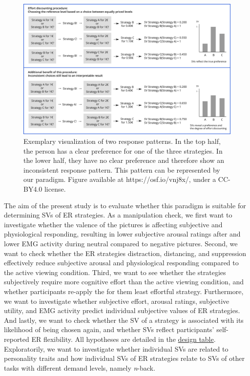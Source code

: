 \documentclass[
  man,floatsintext]{apa6}
\begin{document}
\begin{figure}
\includegraphics[width=\textwidth]{figures/Paradigm_Scheme_T2} \caption{Exemplary visualization of two response patterns. In the top half, the person has a clear preference for one of the three strategies. In the lower half, they have no clear preference and therefore show an inconsistent response pattern. This pattern can be represented by our paradigm. Figure available at https://osf.io/vnj8x/, under a CC-BY4.0 license.}\label{fig:ResponsePatterns}
\end{figure}

The aim of the present study is to evaluate whether this paradigm is suitable for determining SVs of ER strategies.
As a manipulation check, we first want to investigate whether the valence of the pictures is affecting subjective and physiological responding, resulting in lower subjective arousal ratings after and lower EMG activity during neutral compared to negative pictures.
Second, we want to check whether the ER strategies distraction, distancing, and suppression effectively reduce subjective arousal and physiological responding compared to the active viewing condition.
Third, we want to see whether the strategies subjectively require more cognitive effort than the active viewing condition, and whether participants re-apply the for them least effortful strategy.
Furthermore, we want to investigate whether subjective effort, arousal ratings, subjective utility, and EMG activity predict individual subjective values of ER strategies.
And lastly, we want to check whether the SV of a strategy is associated with its likelihood of being chosen again, and whether SVs reflect participants' self-reported ER flexibility.
All hypotheses are detailed in the \protect\hyperlink{DesignTable}{design table}.
Exploratorily, we want to investigate whether individual SVs are related to personality traits and how individual SVs of ER strategies relate to SVs of other tasks with different demand levels, namely \emph{n}-back.
\end{document}
